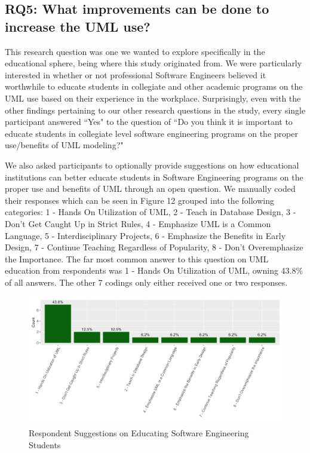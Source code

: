 \documentclass[letterpaper, 10 pt, conference]{ieeeconf}  %
\begin{document}
\subsection{RQ5: What improvements can be done to increase the UML use?}

This research question was one we wanted to explore specifically in the educational sphere, being where this study originated from. We were particularly interested in whether or not professional Software Engineers believed it worthwhile to educate students in collegiate and other academic programs on the UML use based on their experience in the workplace. Surprisingly, even with the other findings pertaining to our other research questions in the study, every single participant answered ``Yes" to the question of ``Do you think it is important to educate students in collegiate level software engineering programs on the proper use/benefits of UML modeling?"

We also asked participants to optionally provide suggestions on how educational institutions can better educate students in Software Engineering programs on the proper use and benefits of UML through an open question. We manually coded their responses which can be seen in Figure 12 grouped into the following categories: 1 - Hands On Utilization of UML, 2 - Teach in Database Design, 3 - Don't Get Caught Up in Strict Rules, 4 - Emphasize UML is a Common Language, 5 - Interdisciplinary Projects, 6 - Emphasize the Benefits in Early Design, 7 - Continue Teaching Regardless of Popularity, 8 - Don't Overemphasize the Importance. The far most common answer to this question on UML education from respondents was 1 - Hands On Utilization of UML, owning 43.8\% of all answers. The other 7 codings only either received one or two responses. 

	\begin{figure}[!htb]
      \centering
      \label{RQ5Concl}
   \end{figure}
   
\begin{figure}[!htb]
      \centering
      \includegraphics[scale=0.25]{Plots/EduPlot}
      \caption{Respondent Suggestions on Educating Software Engineering Students}
      \label{EduUML}
   \end{figure}
   
\end{document}
